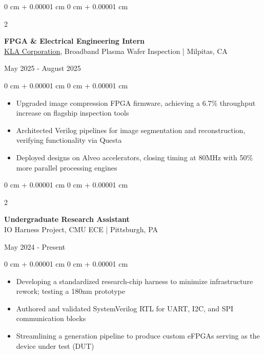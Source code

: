 \documentclass[10pt, letterpaper]{article}
\newlength{\betweenEntriesSpace}
\newlength{\entryToBulletsSpace}
\newlength{\bulletsTopSep}
\newlength{\bulletsParsep}
\newenvironment{highlights}{
    \begin{itemize}[
        label=-,
        topsep=\bulletsTopSep,
        parsep=\bulletsParsep,
        partopsep=0pt,
        itemsep=0pt,
        leftmargin=0 cm + 10pt
    ]
}{
    \end{itemize}
} %
\newenvironment{onecolentry}{
    \begin{adjustwidth}{
        0 cm + 0.00001 cm
    }{
        0 cm + 0.00001 cm
    }
}{
    \end{adjustwidth}
} %
\newenvironment{twocolentry}[2][]{
    \onecolentry
    \def\secondColumn{#2}
    \setcolumnwidth{\fill, 4.5 cm}
    \begin{paracol}{2}
}{
    \switchcolumn \raggedleft \secondColumn
    \end{paracol}
    \endonecolentry
} %
\begin{document}
        \vspace{\betweenEntriesSpace} %

        \begin{twocolentry} 
            {May 2025 - August 2025}
            {\textbf{FPGA \& Electrical Engineering Intern} \\
            \href{https://www.kla.com/}{\underline{KLA Corporation}}, Broadband Plasma Wafer Inspection | Milpitas, CA}
        \end{twocolentry}
        \vspace{\entryToBulletsSpace}
        \begin{onecolentry}
            \begin{highlights}

                \item Upgraded image compression FPGA firmware, achieving a 6.7\% throughput increase on flagship inspection tools
                \item Architected Verilog pipelines for image segmentation and reconstruction, verifying functionality via Questa
                \item Deployed designs on Alveo accelerators, closing timing at 80MHz with 50\% more parallel processing engines
          
            \end{highlights}
        \end{onecolentry}

        \vspace{\betweenEntriesSpace} %

        \begin{twocolentry}
            {May 2024 - Present}
            {\textbf{Undergraduate Research Assistant} \\
            IO Harness Project, CMU ECE | Pittsburgh, PA}
        \end{twocolentry}
        \vspace{\entryToBulletsSpace}
        \begin{onecolentry}
            \begin{highlights}

                \item Developing a standardized research-chip harness to minimize infrastructure rework; testing a 180nm prototype
                \item Authored and validated SystemVerilog RTL for UART, I2C, and SPI communication blocks
                \item Streamlining a generation pipeline to produce custom eFPGAs serving as the device under test (DUT)
 
            \end{highlights}
        \end{onecolentry}
\end{document}
